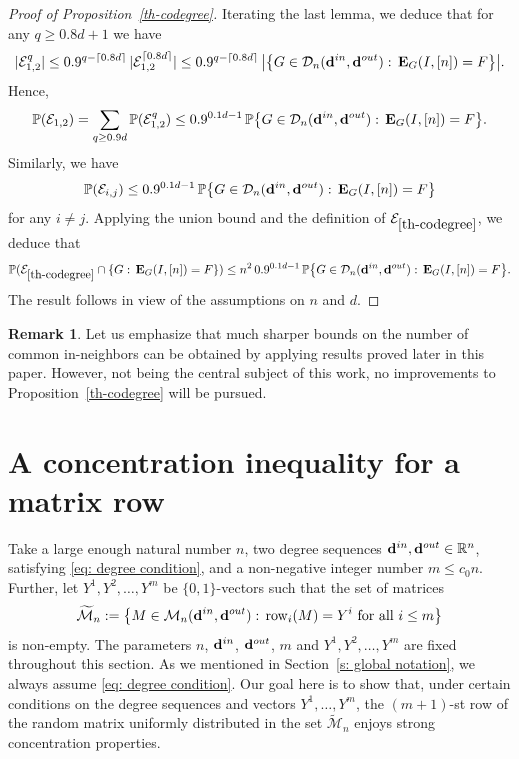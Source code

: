 \documentclass[12pt]{article}
\theoremstyle{definition}
\newtheorem{Remark}[theorem]{Remark}
\theoremstyle{plain}
\newcommand{\R}{\mathbb{R}}
\newcommand{\Event}{\mathcal{E}}
\def\nrangr{G}
\def\edg{{\bf E}_{\nrangr}}
\def\Prob{{\mathbb P}}
\def\InDeg{{\bf d}^{in}}
\def\OutDeg{{\bf d}^{out}}
\def\DGraphSet{{\mathcal D}_n}
\def\MatrixSet{{\mathcal M}_n}
\def\Row{{\rm row}}
\begin{document}
\bigskip

\begin{proof}[Proof of Proposition~\ref{th-codegree}]
Iterating the last lemma, we deduce that for any $q\geq 0.8d+1$ we have
$$
\vert \Event_{1,2}^q\vert \leq 0.9^{q-\lceil 0.8d\rceil} \,
\vert \Event_{1,2}^{\lceil 0.8d\rceil}\vert
\leq 0.9^{q-\lceil 0.8d\rceil} \, \big\vert \big\{\nrangr\in\DGraphSet(\InDeg,\OutDeg):\,\edg(I,[n])=F\big\}\big\vert.
$$
Hence,
$$
\Prob( \Event_{1,2})=\sum_{q\geq 0.9d} \Prob(\Event_{1,2}^q)
\leq 0.9^{0.1d-1}
\, \Prob\big\{\nrangr\in\DGraphSet(\InDeg,\OutDeg):\,\edg(I,[n])=F\big\}.
$$
Similarly, we have 
$$
\Prob( \Event_{i,j})\leq 0.9^{0.1d-1}
\, \Prob\big\{\nrangr\in\DGraphSet(\InDeg,\OutDeg):\,\edg(I,[n])=F\big\}
$$
for any $i\neq j$. 
Applying the union bound and the definition of $\Event_{\ref{th-codegree}}$,
we deduce that
$$\Prob(\Event_{\ref{th-codegree}}\cap \{\nrangr:\,\edg(I,[n])=F\})\leq n^2\, 0.9^{0.1d-1}\,
\Prob\big\{\nrangr\in\DGraphSet(\InDeg,\OutDeg):\,\edg(I,[n])=F\big\}.$$
The result follows in view of the assumptions on $n$ and $d$.
\end{proof}

\begin{Remark}
Let us emphasize that much sharper bounds on the number of common
in-neighbors can be obtained by applying results
proved later in this paper. However, not being the central subject of this work,
no improvements to Proposition~\ref{th-codegree} will be pursued.
\end{Remark}



\section{A concentration inequality for a matrix row}\label{s: row concentr}

Take a large enough natural number $n$, two degree sequences $\InDeg,\OutDeg\in\R^n$,
satisfying \eqref{eq: degree condition}, 
and a non-negative integer number $m\leq c_0 n$.  
Further, let $Y^1,Y^2,\ldots,Y^m$ be $\{0,1\}$-vectors such that the set of matrices
$$\widetilde\MatrixSet:=\bigl\{M\in\MatrixSet(\InDeg,\OutDeg):\,\Row_i(M)=Y^i\mbox{ for all }i\leq m\bigr\}$$
is non-empty. The parameters $n$, $\InDeg$, $\OutDeg$, $m$ and $Y^1,Y^2,\ldots,Y^m$ are fixed throughout this section.
As we mentioned in Section~\ref{s: global notation}, we always assume \eqref{eq: degree condition}.
Our goal here is to show that, under certain conditions on the degree sequences and
vectors $Y^1,\ldots,Y^m$, the $(m+1)$-st row of the random matrix uniformly
distributed in the set $\widetilde\MatrixSet$ enjoys strong concentration properties.
\end{document}
